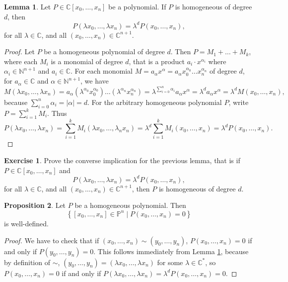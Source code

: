 \documentclass{article}
\newcommand{\N}{\mathbb{N}}
\newcommand{\C}{\mathbb{C}}
\renewcommand{\P}{\mathbb{P}}
\newcommand{\rb}[1]{\left( #1 \right)}
\renewcommand{\sb}[1]{\left[ #1 \right]}
\newcommand{\cb}[1]{\left\{ #1 \right\}}
\newcommand{\abs}[1]{\left\lvert #1 \right\rvert}
\theoremstyle{definition}\newtheorem{definition}{Definition}[section]
\theoremstyle{definition}\newtheorem{notation}[definition]{Notation}
\theoremstyle{definition}\newtheorem{remark}[definition]{Remark}
\theoremstyle{definition}\newtheorem{example}[definition]{Example}
\theoremstyle{definition}\newtheorem{fact}{Fact}
\theoremstyle{definition}\newtheorem{exercise}{Exercise}
\newtheorem{proposition}[definition]{Proposition}
\newtheorem{lemma}[definition]{Lemma}
\begin{document}
\begin{lemma}
\label{lem:4.4}
Let $ P \in \C\sb{x_0, \dots, x_n} $ be a polynomial. If $ P $ is homogeneous of degree $ d $, then
$$ P\rb{\lambda x_0, \dots, \lambda x_n} = \lambda^dP\rb{x_0, \dots, x_n}, $$ for all $ \lambda \in \C $, and all $ \rb{x_0, \dots, x_n} \in \C^{n + 1} $.
\end{lemma}

\begin{proof}
Let $ P $ be a homogeneous polynomial of degree $ d $. Then $ P = M_1 + \dots + M_k $, where each $ M_i $ is a monomial of degree $ d $, that is a product $ a_i \cdot x^{\alpha_i} $ where $ \alpha_i \in \N^{n + 1} $ and $ a_i \in \C $. For each monomial $ M = a_\alpha x^\alpha = a_\alpha x_0^{\alpha_0} \dots x_n^{\alpha_n} $ of degree $ d $, for $ a_\alpha \in \C $ and $ \alpha \in \N^{n + 1} $, we have
$$ M\rb{\lambda x_0, \dots, \lambda x_n} = a_\alpha\rb{\lambda^{\alpha_0}x_0^{\alpha_0}} \dots \rb{\lambda^{\alpha_n}x_n^{\alpha_n}} = \lambda^{\sum_{i = 0}^n \alpha_i}a_\alpha x^\alpha = \lambda^da_\alpha x^\alpha = \lambda^dM\rb{x_0, \dots, x_n}, $$
because $ \sum_{i = 0}^n \alpha_i = \abs{\alpha} = d $. For the arbitrary homogeneous polynomial $ P $, write $ P = \sum_{i = 1}^k M_i $. Thus
$$ P\rb{\lambda x_0, \dots, \lambda x_n} = \sum_{i = 1}^k M_i\rb{\lambda x_0, \dots, \lambda_n x_n} = \lambda^d\sum_{i = 1}^k M_i\rb{x_0, \dots, x_n} = \lambda^dP\rb{x_0, \dots, x_n}. $$
\end{proof}

\begin{exercise}
Prove the converse implication for the previous lemma, that is if $ P \in \C\sb{x_0, \dots, x_n} $ and
$$ P\rb{\lambda x_0, \dots, \lambda x_n} = \lambda^dP\rb{x_0, \dots, x_n}, $$
for all $ \lambda \in \C $, and all $ \rb{x_0, \dots, x_n} \in \C^{n + 1} $, then $ P $ is homogeneous of degree $ d $.
\end{exercise}

\begin{proposition}
Let $ P $ be a homogeneous polynomial. Then
$$ \cb{\sb{x_0, \dots, x_n} \in \P^n \mid P\rb{x_0, \dots, x_n} = 0} $$
is well-defined.
\end{proposition}

\begin{proof}
We have to check that if $ \rb{x_0, \dots, x_n} \sim \rb{y_0, \dots, y_n} $, $ P\rb{x_0, \dots, x_n} = 0 $ if and only if $ P\rb{y_0, \dots, y_n} = 0 $. This follows immediately from Lemma \ref{lem:4.4}, because by definition of $ \sim $, $ \rb{y_0, \dots, y_n} = \rb{\lambda x_0, \dots, \lambda x_n} $ for some $ \lambda \in \C^* $, so $ P\rb{x_0, \dots, x_n} = 0 $ if and only if $ P\rb{\lambda x_0, \dots, \lambda x_n} = \lambda^dP\rb{x_0, \dots, x_n} = 0 $.
\end{proof}
\end{document}
